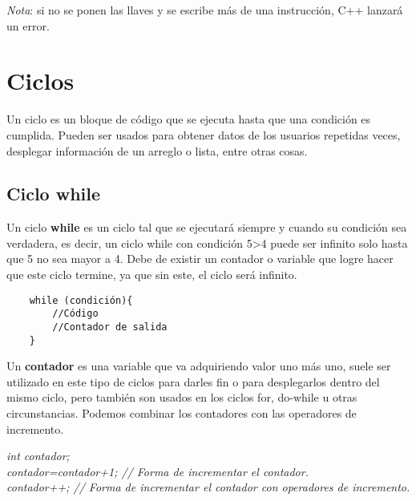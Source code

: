 \textit{Nota}: si no se ponen las llaves y se escribe más de una instrucción, C++ lanzará un error.



\section{Ciclos}
\hspace{0.55cm}Un ciclo es un bloque de código que se ejecuta hasta que una condición es cumplida. Pueden ser usados para obtener datos de los usuarios repetidas veces, desplegar información de un arreglo o lista, entre otras cosas.


\subsection{Ciclo while}
\hspace{0.55cm}Un ciclo \textbf{while} es un ciclo tal que se ejecutará siempre y cuando su condición sea verdadera, es decir, un ciclo while con condición 5\textgreater 4 puede ser infinito solo hasta que 5 no sea mayor a 4. Debe de existir un contador o variable que logre hacer que este ciclo termine, ya que sin este, el ciclo será infinito.
\begin{lstlisting}
    while (condición){
        //Código
        //Contador de salida
    }
\end{lstlisting}

Un \textbf{contador} es una variable que va adquiriendo valor uno más uno, suele ser utilizado en este tipo de ciclos para darles fin o para desplegarlos dentro del mismo ciclo, pero también son usados en los ciclos for, do-while u otras circunstancias. Podemos combinar los contadores con las operadores de incremento.
\begin{center}
    \textit{
        int contador; \\
        contador=contador+1; // Forma de incrementar el contador. \\
        contador++; // Forma de incrementar el contador con operadores de incremento.
    }
\end{center}

